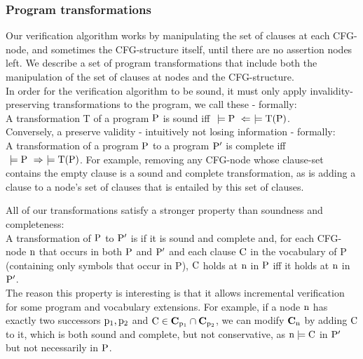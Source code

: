 \subsubsection*{Program transformations}
Our verification algorithm works by manipulating the set of clauses at each CFG-node, and sometimes the CFG-structure itself, until there are no assertion nodes left. 
We describe a set of program transformations that include both the manipulation of the set of clauses at nodes and the CFG-structure.\\
In order for the verification algorithm to be sound, it must only apply invalidity-preserving transformations to the program, we call these  - formally:\\
A transformation T of a program $\mathrm{P}$ is sound iff $\mathrm{~\models P ~ \Leftarrow ~\models T(P)}$.\\
Conversely, a  preserve validity - intuitively not losing information - formally:\\
A transformation of a program $\mathrm{P}$ to a program $\mathrm{P'}$ is complete iff\\ $\mathrm{~\models P ~ \Rightarrow ~\models T(P)}$.
For example, removing any CFG-node whose clause-set contains the empty clause is a sound and complete transformation, as is adding a clause to a node's set of clauses that is entailed by this set of clauses.

\noindent
All of our transformations satisfy a stronger property than soundness and completeness:\\
A transformation of $\mathrm{P}$ to $\mathrm{P'}$ is  if it is sound and complete and, for each CFG-node $\mathrm{n}$ that occurs in both $\mathrm{P}$ and $\mathrm{P'}$ and each clause $\mathrm{C}$ in the vocabulary of P (containing only symbols that occur in P), $\mathrm{C}$ holds at $\mathrm{n}$ in $\mathrm{P}$ iff it holds at $\mathrm{n}$ in $\mathrm{P'}$.\\
The reason this property is interesting is that it allows incremental verification for some program and vocabulary extensions.
For example, if a node $\mathrm{n}$ has exactly two successors $\mathrm{p_1,p_2}$ and $\mathrm{C \in \mathbf{C}_{\mathrm{p_1}} \cap \mathbf{C}_{\mathrm{p_2}}}$, 
we can modify $\mathbf{C}_{\mathrm{n}}$ by adding $\mathrm{C}$ to it, which is both sound and complete, but not conservative, as $\mathrm{n \models C}$ in $\mathrm{P'}$ but not necessarily in $\mathrm{P}$.

